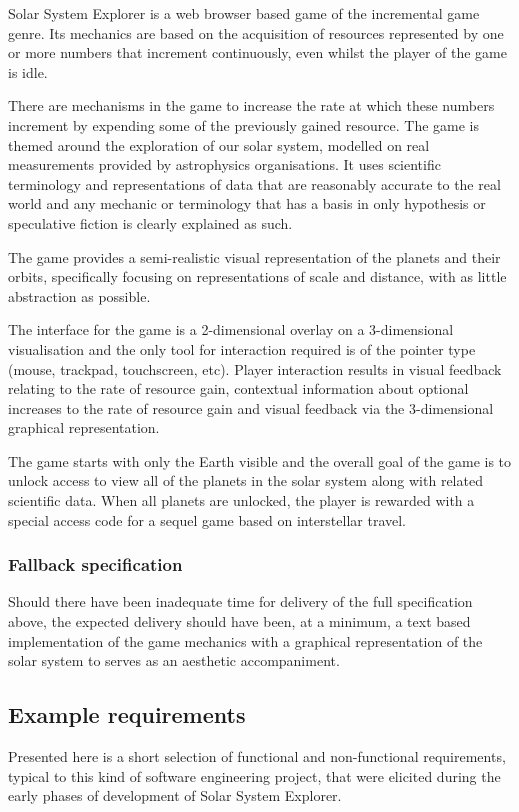 \documentclass[twoside]{bhamthesis}
\begin{document}
Solar System Explorer is a web browser based game of the incremental game genre. Its mechanics are based on the acquisition of resources represented by one or more numbers that increment continuously, even whilst the player of the game is idle.

There are mechanisms in the game to increase the rate at which these numbers increment by expending some of the previously gained resource. The game is themed around the exploration of our solar system, modelled on real measurements provided by astrophysics organisations. It uses scientific terminology and representations of data that are reasonably accurate to the real world and any mechanic or terminology that has a basis in only hypothesis or speculative fiction is clearly explained as such.

The game provides a semi-realistic visual representation of the planets and their orbits, specifically focusing on representations of scale and distance, with as little abstraction as possible.

The interface for the game is a 2-dimensional overlay on a 3-dimensional visualisation and the only tool for interaction required is of the pointer type (mouse, trackpad, touchscreen, etc). Player interaction results in visual feedback relating to the rate of resource gain, contextual information about optional increases to the rate of resource gain and visual feedback via the 3-dimensional graphical representation.

The game starts with only the Earth visible and the overall goal of the game is to unlock access to view all of the planets in the solar system along with related scientific data. When all planets are unlocked, the player is rewarded with a special access code for a sequel game based on interstellar travel.

\subsubsection{Fallback specification}
Should there have been inadequate time for delivery of the full specification above, the expected delivery should have been, at a minimum, a text based implementation of the game mechanics with a graphical representation of the solar system to serves as an aesthetic accompaniment.

\subsection{Example requirements}
Presented here is a short selection of functional and non-functional requirements, typical to this kind of software engineering project, that were elicited during the early phases of development of Solar System Explorer.
\end{document}
